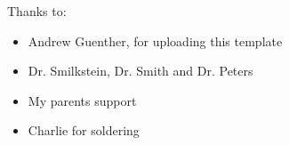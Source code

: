 \noindent
Thanks to:
\begin{itemize}
    \item Andrew Guenther, for uploading this template \cite{thesis_template}
    \item Dr. Smilkstein, Dr. Smith and Dr. Peters
    \item My parents support
    \item Charlie for soldering
\end{itemize}
